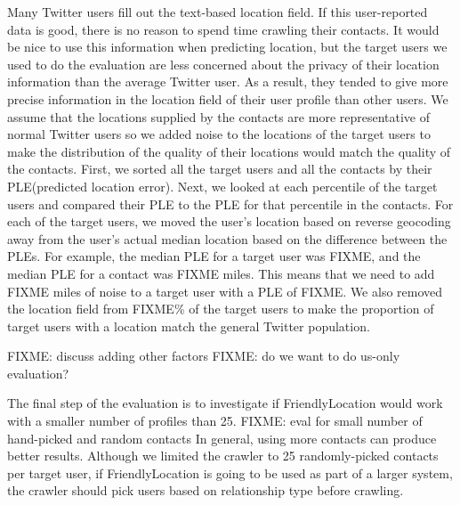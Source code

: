 Many Twitter users fill out the text-based location field.
%
If this user-reported data is good, there is no reason to spend time
crawling their contacts.
%
It would be nice to use this information when predicting location, but
the target users we used to do the evaluation are less concerned about
the privacy of their location information than the average Twitter user.
%
As a result, they tended to give more precise information in the location
field of their user profile than other users.
%
We assume that the locations supplied by the contacts are more
representative of normal Twitter users so we added noise to the locations
of the target users to make the distribution of the quality of their
locations would match the quality of the contacts.
%
First, we sorted all the target users and all the contacts by their
PLE(predicted location error).
%
Next, we looked at each percentile of the target users and compared
their PLE to the PLE for that percentile in the contacts.
%
For each of the target users, we moved the user's location based on
reverse geocoding away from the user's actual median location based on the
difference between the PLEs.
%
For example, the median PLE for a target user was FIXME, and the median
PLE for a contact was FIXME miles.
%
This means that we need to add FIXME miles of noise to a target user
with a PLE of FIXME.
%
We also removed the location field from FIXME\% of the target users to
make the proportion of target users with a location match the general
Twitter population.

FIXME: discuss adding other factors
FIXME: do we want to do us-only evaluation?

The final step of the evaluation is to investigate if FriendlyLocation would
work with a smaller number of profiles than 25.
%
FIXME: eval for small number of hand-picked and random contacts
%
In general, using more contacts can produce better results.
%
Although we limited the crawler to 25 randomly-picked contacts per target
user, if FriendlyLocation is going to be used as part of a larger system, the
crawler should pick users based on relationship type before crawling.



